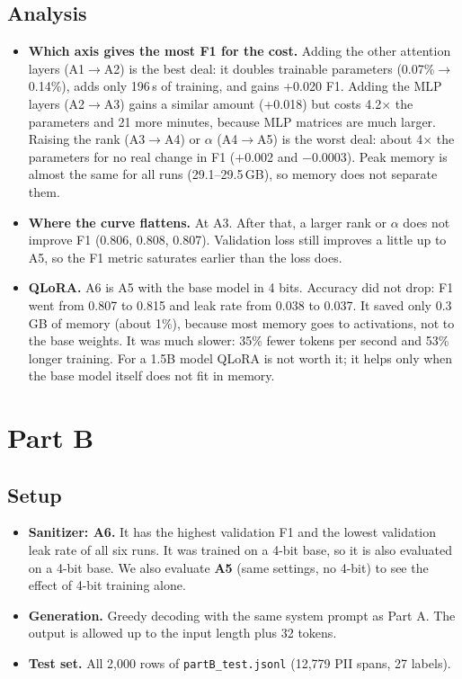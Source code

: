 \documentclass[10pt]{article}
\begin{document}
\subsection{Analysis}
\begin{itemize}
  \item \textbf{Which axis gives the most F1 for the cost.} Adding the other attention layers (A1$\to$A2) is the best deal: it doubles trainable parameters (0.07\%$\to$0.14\%), adds only 196\,s of training, and gains +0.020 F1. Adding the MLP layers (A2$\to$A3) gains a similar amount (+0.018) but costs 4.2$\times$ the parameters and 21 more minutes, because MLP matrices are much larger. Raising the rank (A3$\to$A4) or $\alpha$ (A4$\to$A5) is the worst deal: about 4$\times$ the parameters for no real change in F1 ($+$0.002 and $-$0.0003). Peak memory is almost the same for all runs (29.1--29.5\,GB), so memory does not separate them.
  \item \textbf{Where the curve flattens.} At A3. After that, a larger rank or $\alpha$ does not improve F1 (0.806, 0.808, 0.807). Validation loss still improves a little up to A5, so the F1 metric saturates earlier than the loss does.
  \item \textbf{QLoRA.} A6 is A5 with the base model in 4 bits. Accuracy did not drop: F1 went from 0.807 to 0.815 and leak rate from 0.038 to 0.037. It saved only 0.3\,GB of memory (about 1\%), because most memory goes to activations, not to the base weights. It was much slower: 35\% fewer tokens per second and 53\% longer training. For a 1.5B model QLoRA is not worth it; it helps only when the base model itself does not fit in memory.
\end{itemize}

\section{Part B}

\subsection{Setup}
\begin{itemize}
  \item \textbf{Sanitizer: A6.} It has the highest validation F1 and the lowest validation leak rate of all six runs. It was trained on a 4-bit base, so it is also evaluated on a 4-bit base. We also evaluate \textbf{A5} (same settings, no 4-bit) to see the effect of 4-bit training alone.
  \item \textbf{Generation.} Greedy decoding with the same system prompt as Part A. The output is allowed up to the input length plus 32 tokens.
  \item \textbf{Test set.} All 2{,}000 rows of \texttt{partB\_test.jsonl} (12{,}779 PII spans, 27 labels).
\end{itemize}
\end{document}
